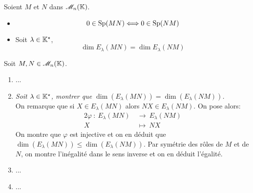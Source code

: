 \begin{prop}{}
    Soient $M$ et $N$ dans $\mathscr{M}_n(\mathbb{K})$.
    \begin{itemize}
        \item $$0 \in \mathrm{Sp}(MN) \Longleftrightarrow 0 \in \mathrm{Sp}(NM)$$
        \item Soit $\lambda \in \mathbb{K}^\star$,
        $$\dim E_\lambda(MN) = \dim E_\lambda(NM)$$
    \end{itemize}
\end{prop}

Soit $M, N \in \mathscr{M}_n(\mathbb{K})$. 
\begin{enumerate}
    \item ...
    \item \emph{Soit $\lambda \in \mathbb{K}^\star$, montrer que $\dim(E_\lambda (MN)) = \dim(E_\lambda (NM))$.} \\
    On remarque que si $X \in E_\lambda (MN)$ alors $NX \in E_\lambda (NM)$. On pose alors:
    \begin{alignat*}{2}
        \varphi\ :\ E_\lambda (MN)\ &\longrightarrow\ E_\lambda (NM)\\
        X\ &\longmapsto\ NX
    \end{alignat*}
    On montre que $\varphi$ est injective et on en déduit que $\dim(E_\lambda (MN)) \leqslant \dim(E_\lambda (NM))$. Par symétrie des rôles de $M$ et de $N$, on montre l'inégalité dans le sens inverse et on en déduit l'égalité.
    \item ...
    \item ...
\end{enumerate}
